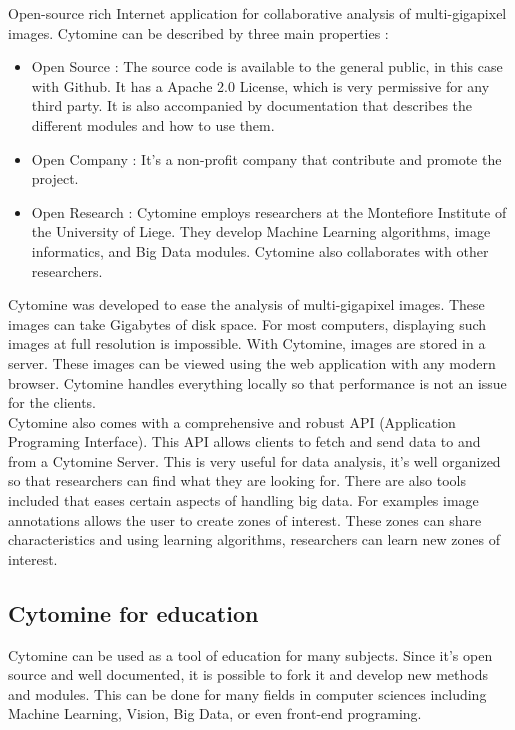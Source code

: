 \documentclass[a4paper,11pt]{report}
\numberwithin{figure}{section} %
\begin{document}
Open-source rich Internet application for collaborative analysis of multi-gigapixel images. Cytomine can be described by three main properties :
\begin{itemize}
\item[\textbullet] Open Source : The source code is available to the general public, in this case with Github. It has a Apache 2.0 License, which is very permissive for any third party. It is also accompanied by documentation that describes the different modules and how to use them.
\item[\textbullet] Open Company : It's a non-profit company that contribute and promote the project.
\item[\textbullet] Open Research : Cytomine employs researchers at the Montefiore Institute of the University of Liege. They develop Machine Learning algorithms, image informatics, and Big Data modules. Cytomine also collaborates with other researchers.
\end{itemize}

Cytomine was developed to ease the analysis of multi-gigapixel images. These images can take Gigabytes of disk space. For most computers, displaying such images at full resolution is impossible. With Cytomine, images are stored in a server. These images can be viewed using the web application with any modern browser. Cytomine handles everything locally so that performance is not an issue for the clients.\\

	Cytomine also comes with a comprehensive and robust API (Application Programing Interface). This API allows clients to fetch and send data to and from a Cytomine Server. This is very useful for data analysis, it's well organized so that researchers can find what they are looking for. There are also tools included that eases certain aspects of handling big data. For examples image annotations allows the user to create zones of interest. These zones can share characteristics and using learning algorithms, researchers can learn new zones of interest.

\subsection{Cytomine for education}

Cytomine can be used as a tool of education for many subjects. Since it's open source and well documented, it is possible to fork it and develop new methods and modules. This can be done for many fields in computer sciences including Machine Learning, Vision, Big Data, or even front-end programing.\\
\end{document}
